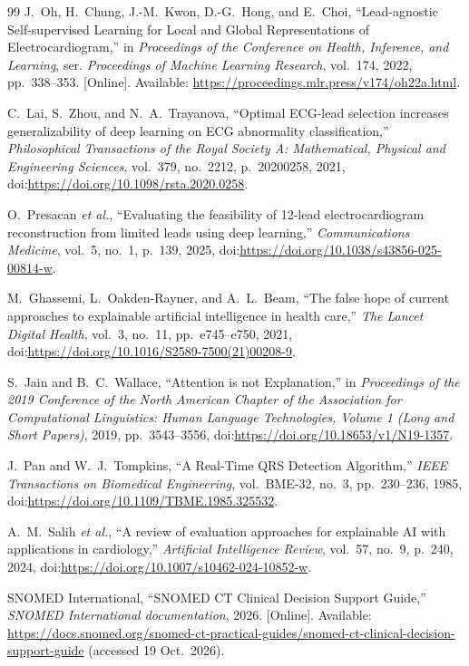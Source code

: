\begin{thebibliography}{99}
J.~Oh, H.~Chung, J.-M.~Kwon, D.-G.~Hong, and E.~Choi, ``Lead-agnostic Self-supervised Learning for Local and Global Representations of Electrocardiogram,'' in \textit{Proceedings of the Conference on Health, Inference, and Learning}, ser. \textit{Proceedings of Machine Learning Research}, vol.~174, 2022, pp.~338--353. [Online]. Available: \url{https://proceedings.mlr.press/v174/oh22a.html}.

C.~Lai, S.~Zhou, and N.~A.~Trayanova, ``Optimal ECG-lead selection increases generalizability of deep learning on ECG abnormality classification,'' \textit{Philosophical Transactions of the Royal Society A: Mathematical, Physical and Engineering Sciences}, vol.~379, no.~2212, p.~20200258, 2021, doi:\url{https://doi.org/10.1098/rsta.2020.0258}.

O.~Presacan \textit{et al.}, ``Evaluating the feasibility of 12-lead electrocardiogram reconstruction from limited leads using deep learning,'' \textit{Communications Medicine}, vol.~5, no.~1, p.~139, 2025, doi:\url{https://doi.org/10.1038/s43856-025-00814-w}.

M.~Ghassemi, L.~Oakden-Rayner, and A.~L.~Beam, ``The false hope of current approaches to explainable artificial intelligence in health care,'' \textit{The Lancet Digital Health}, vol.~3, no.~11, pp.~e745--e750, 2021, doi:\url{https://doi.org/10.1016/S2589-7500(21)00208-9}.

S.~Jain and B.~C.~Wallace, ``Attention is not Explanation,'' in \textit{Proceedings of the 2019 Conference of the North American Chapter of the Association for Computational Linguistics: Human Language Technologies, Volume 1 (Long and Short Papers)}, 2019, pp.~3543--3556, doi:\url{https://doi.org/10.18653/v1/N19-1357}.

J.~Pan and W.~J.~Tompkins, ``A Real-Time QRS Detection Algorithm,'' \textit{IEEE Transactions on Biomedical Engineering}, vol.~BME-32, no.~3, pp.~230--236, 1985, doi:\url{https://doi.org/10.1109/TBME.1985.325532}.

A.~M.~Salih \textit{et al.}, ``A review of evaluation approaches for explainable AI with applications in cardiology,'' \textit{Artificial Intelligence Review}, vol.~57, no.~9, p.~240, 2024, doi:\url{https://doi.org/10.1007/s10462-024-10852-w}.

SNOMED International, ``SNOMED CT Clinical Decision Support Guide,'' \textit{SNOMED International documentation}, 2026. [Online]. Available: \url{https://docs.snomed.org/snomed-ct-practical-guides/snomed-ct-clinical-decision-support-guide} (accessed 19 Oct.~2026).


\end{thebibliography}

